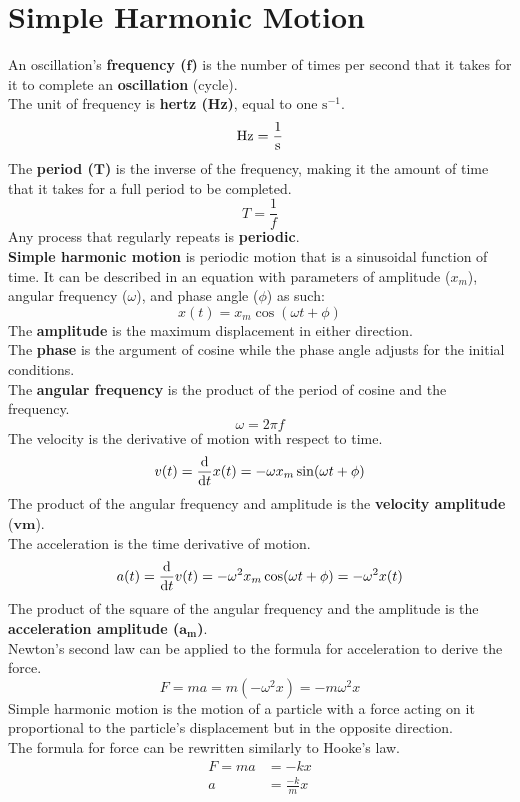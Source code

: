 \documentclass[../AP_Physics_C.tex]{subfiles}
\begin{document}
			\section{Simple Harmonic Motion}
				An oscillation's \textbf{frequency ($\bm{f}$)} is the number of times per second that it takes for it to complete an \textbf{oscillation} (cycle). \\
				The unit of frequency is  \textbf{hertz (Hz)}, equal to one $\mathrm{s}^{-1}$.
				\[\operatorname{Hz} = \frac{1}{\operatorname{s}}\]
				The \textbf{period ($\bm{T}$)} is the inverse of the frequency, making it the amount of time that it takes for a full period to be completed.
				\[T = \frac{1}{f}\]
				Any process that regularly repeats is \textbf{periodic}. \\
				\textbf{Simple harmonic motion} is periodic motion that is a sinusoidal function of time. It can be described in an equation with parameters of amplitude ($x_m$), angular frequency ($\omega$), and phase angle ($\phi$) as such:
				\[x(t) = x_m\cos(\omega t + \phi)\]
				The \textbf{amplitude} is the maximum displacement in either direction. \\
				The \textbf{phase} is the argument of cosine while the phase angle adjusts for the initial conditions. \\
				The \textbf{angular frequency} is the product of the period of cosine and the frequency.
				\[\omega = 2\pi f\]
				The velocity is the derivative of motion with respect to time.
				\[v(t) = \frac{\mathrm{d}}{\mathrm{d} t}x(t) = -\omega x_m\sin(\omega t + \phi)\]
				The product of the angular frequency and amplitude is the \textbf{velocity amplitude} ($\bm{vm}$). \\
				The acceleration is the time derivative of motion.
				\[a(t) = \frac{\mathrm{d}}{\mathrm{d} t}v(t) = -\omega^2x_m\cos(\omega t + \phi) = -\omega^2x(t)\]
				The product of the square of the angular frequency and the amplitude is the \textbf{acceleration amplitude ($\bm{a_m}$)}. \\
				Newton's second law can be applied to the formula for acceleration to derive the force.
				\[F = ma = m(-\omega^2x) = -m\omega^2x\]
				Simple harmonic motion is the motion of a particle with a force acting on it proportional to the particle's displacement but in the opposite direction. \\
				The formula for force can be rewritten similarly to Hooke's law.
				\begin{align*}
					F = ma &= -kx \\
					a &= \frac{-k}{m}x
				\end{align*}
\end{document}

